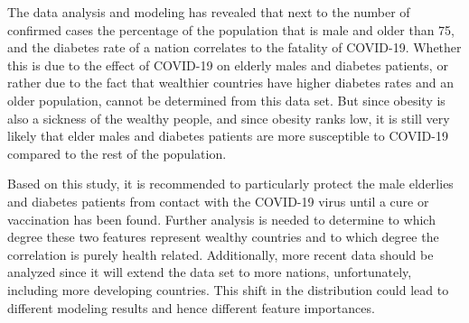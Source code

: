 \documentclass[a4paper, 11pt]{article} %
\begin{document}
The data analysis and modeling has revealed that next to the number of confirmed cases the percentage of the population that is male and older than 75, and the diabetes rate of a nation correlates to the fatality of COVID-19. Whether this is due to the effect of COVID-19 on elderly males and diabetes patients, or rather due to the fact that wealthier countries have higher diabetes rates and an older population, cannot be determined from this data set. But since obesity is also a sickness of the wealthy people, and since obesity ranks low, it is still very likely that elder males and diabetes patients are more susceptible to COVID-19 compared to the rest of the population.

Based on this study, it is recommended to particularly protect the male elderlies and diabetes patients from contact with the COVID-19 virus until a cure or vaccination has been found. Further analysis is needed to determine to which degree these two features represent wealthy countries  and to which degree the correlation is purely health related. Additionally, more recent data should be analyzed since it will extend the data set to more nations, unfortunately, including more developing countries. This shift in the distribution could lead to different modeling results and hence different feature importances.
\end{document}
